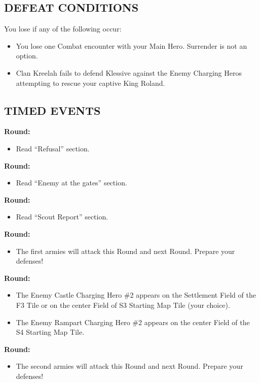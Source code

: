 \begin{multicols}{2}
\subsection*{\MakeUppercase{Defeat Conditions}}

You lose if any of the following occur:

\begin{itemize}
  \item You lose one Combat encounter with your Main Hero.
    Surrender is not an option.
  \item Clan Kreelah fails to defend Klessive against the Enemy Charging Heros attempting to rescue your captive King Roland.
\end{itemize}

\subsection*{\MakeUppercase{Timed Events}}

\textbf{ Round:}
\begin{itemize}
  \item Read ``Refusal'' section.
\end{itemize}

\textbf{ Round:}
\begin{itemize}
  \item Read ``Enemy at the gates'' section.
\end{itemize}

\textbf{ Round:}
\begin{itemize}
  \item Read ``Scout Report'' section.
\end{itemize}

\textbf{ Round:}
\begin{itemize}
  \item The first armies will attack this Round and next Round. Prepare your defenses!
\end{itemize}

\textbf{ Round:}
\begin{itemize}
  \item The Enemy Castle Charging Hero \#2 appears on the Settlement Field of the F3 Tile or on the center Field of S3 Starting Map Tile (your choice).
  \item The Enemy Rampart Charging Hero \#2 appears on the center Field of the S4 Starting Map Tile.
\end{itemize}

\textbf{ Round:}
\begin{itemize}
  \item The second armies will attack this Round and next Round. Prepare your defenses!
\end{itemize}



\end{multicols}
